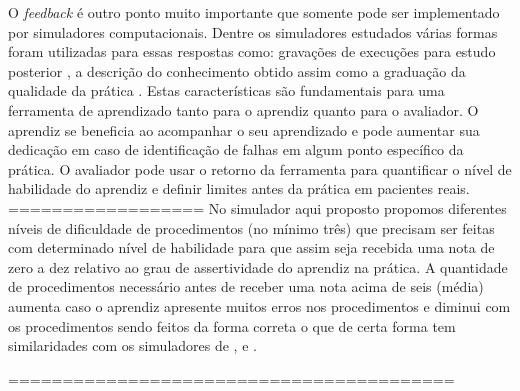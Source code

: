 O \textit{feedback} é outro ponto muito importante que somente pode ser implementado por simuladores computacionais. Dentre os simuladores estudados várias formas foram utilizadas para essas respostas como: gravações de execuções para estudo posterior \cite{Farber2009, Frazzetto2011}, a descrição do conhecimento obtido assim como a graduação da qualidade da prática \cite{Wilson2003, Dreifaldt2006, Brazil2017}. Estas características são fundamentais para uma ferramenta de aprendizado tanto para o aprendiz quanto para o avaliador. O aprendiz se beneficia ao acompanhar o seu aprendizado e pode aumentar sua dedicação em caso de identificação de falhas em algum ponto específico da prática. O avaliador pode usar o retorno da ferramenta para quantificar o nível de habilidade do aprendiz e definir limites antes da prática em pacientes reais. ================== No simulador aqui proposto propomos diferentes níveis de dificuldade de procedimentos (no mínimo três) que precisam ser feitas com determinado nível de habilidade para que assim seja recebida uma nota de zero a dez relativo ao grau de assertividade do aprendiz na prática. A quantidade de procedimentos necessário antes de receber uma nota acima de seis (média) aumenta caso o aprendiz apresente muitos erros nos procedimentos e diminui com os procedimentos sendo feitos da forma correta o que de certa forma tem similaridades com os simuladores de \textcite{Wilson2003}, \textcite{Dreifaldt2006} e \textcite{Brazil2017}. 

=========================================
